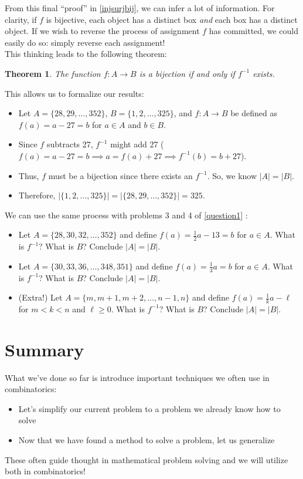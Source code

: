 \documentclass[openany]{book}
\newtheorem{thm}{Theorem}[section]
\theoremstyle{definition}
\begin{document}
From this final ``proof'' in \ref{injsurjbij}, we can infer a lot of information. For clarity, if $f$ is bijective, each object has a distinct box \emph{and} each box has a distinct object. If we wish to reverse the process of assignment $f$ has committed, we could easily do so: simply reverse each assignment! \\
This thinking leads to the following theorem:
\begin{thm}\hfill

    The function $f:A\to B$ is a bijection if and only if $f^{-1}$ exists.
\end{thm}
This allows us to formalize our results:
\begin{itemize}
    \item Let $A=\{28,29,\dots, 352\}$, $B=\{1,2,\dots, 325\}$, and $f:A\to B$ be defined as $f(a)=a-27=b$ for $a\in A$ and $b\in B$.
    \item Since $f$ subtracts 27, $f^{-1}$ might add 27 ($f(a)=a-27=b\implies a=f(a)+27\implies f^{-1}(b)=b+27$).
    \item Thus, $f$ must be a bijection since there exists an $f^{-1}$. So, we know $|A|=|B|$. 
    \item Therefore, $|\{1,2,\dots, 325\}|=|\{28,29,\dots, 352\}|=325$.
\end{itemize}
We can use the same process with problems 3 and 4 of \ref{question1}
:
\begin{itemize}
\item Let $A=\{28,30, 32,\dots, 352\}$ and define $f(a)=\frac{1}{2}a-13=b$ for $a\in A$. What is $f^{-1}$? What is $B$? Conclude $|A|=|B|$.
\item Let $A=\{30,33,36,\dots,348,351\}$ and define $f(a)=\frac{1}{3}a=b$ for $a\in A$. What is $f^{-1}$? What is $B$? Conclude $|A|=|B|$.
\item (Extra!) Let $A=\{m,m+1,m+2,\dots, n-1, n\}$ and define $f(a)=\frac{1}{k}a-\ell$ for $m<k<n$ and $\ell\geq 0$. What is $f^{-1}$? What is $B$? Conclude $|A|=|B|$.
\end{itemize}

\section{Summary}
What we've done so far is introduce important techniques we often use in combinatorics:
\begin{itemize}
        \item  Let's simplify our current problem to a problem we already know how to solve
        \item  Now that we have found a method to solve a problem, let us generalize  
    \end{itemize}
These often guide thought in mathematical problem solving and we will utilize both in combinatorics!
\end{document}
